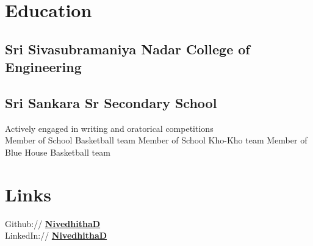 \documentclass[]{deedy-resume-openfont}
\begin{document}
%
%

%
%

%
%

\begin{minipage}[t]{0.33\textwidth} 


\section{Education} 

\subsection{Sri Sivasubramaniya Nadar College of Engineering}
\sectionsep

\subsection{Sri Sankara Sr Secondary School}
Actively engaged in writing and oratorical competitions \\
Member of School Basketball team
Member of School Kho-Kho team
Member of Blue House Basketball team
\sectionsep


\section{Links}
Github:// \href{https://github.com/nive927}{\bf NivedhithaD} \\
LinkedIn://  \href{https://www.linkedin.com/in/nivedhitha-d-0bb67b1b0}{\bf NivedhithaD} \\


\end{minipage}
\end{document}
